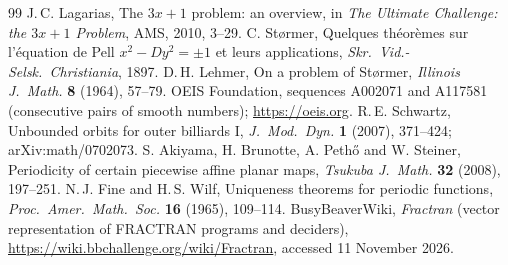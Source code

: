 \documentclass[11pt,a4paper]{article}
\theoremstyle{definition}
\begin{document}
\begin{thebibliography}{99}
 J.\,C. Lagarias, The $3x+1$ problem: an overview, in \emph{The Ultimate Challenge: the $3x+1$ Problem}, AMS, 2010, 3--29.
 C. St{\o}rmer, Quelques th\'eor\`emes sur l'\'equation de Pell $x^2-Dy^2=\pm1$ et leurs applications, \emph{Skr.\ Vid.-Selsk.\ Christiania}, 1897.
 D.\,H. Lehmer, On a problem of St{\o}rmer, \emph{Illinois J.\ Math.} \textbf{8} (1964), 57--79.
 OEIS Foundation, sequences A002071 and A117581 (consecutive pairs of smooth numbers); \url{https://oeis.org}.
 R.\,E. Schwartz, Unbounded orbits for outer billiards I, \emph{J.\ Mod.\ Dyn.} \textbf{1} (2007), 371--424; arXiv:math/0702073.
 S. Akiyama, H. Brunotte, A. Peth\H{o} and W. Steiner, Periodicity of certain piecewise affine planar maps, \emph{Tsukuba J.\ Math.} \textbf{32} (2008), 197--251.
 N.\,J. Fine and H.\,S. Wilf, Uniqueness theorems for periodic functions, \emph{Proc.\ Amer.\ Math.\ Soc.} \textbf{16} (1965), 109--114.
 BusyBeaverWiki, \emph{Fractran} (vector representation of FRACTRAN programs and deciders), \url{https://wiki.bbchallenge.org/wiki/Fractran}, accessed 11 November 2026.
\end{thebibliography}

\appendix
\end{document}
